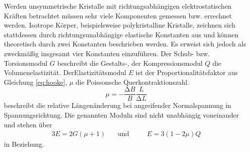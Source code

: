 Werden unsymmetrische Kristalle mit richtungsabhängigen elektrostatischen Kräften betrachtet müssen sehr viele Komponenten gemessen bzw. errechnet werden. 
Isotrope Körper, beispielsweise polykristalline Kristalle, zeichnen sich stattdessen durch richtungsunabhängige elastische Konstanten aus und können theoretisch durch zwei Konstanten beschrieben werden. 
Es erweist sich jedoch als zweckmäßig insgesamt vier Konstanten einzuführen.
Der Schub- bzw. Torsionsmodul $G$ beschreibt die Gestalts-, der Kompressionsmodul $Q$ die Volumenelastizität.
DerElastizitätsmodul $E$ ist der Proportionalitätsfaktor aus Gleichung \eqref{eq:hooke}, $\mu$ die Poissonsche Querkontraktionszahl. 
\begin{equation}
\mu=-\frac{\mathup{\Delta}{B}}{B}\frac{L}{\mathup{\Delta}{L}}
\label{eq:mu}
\end{equation}
beschreibt die relative Längenänderung bei angreifender Normalspannung in Spannungsrichtung.
Die genannten Moduln sind nicht unabhängig voneinander und stehen über
\begin{alignat}{3}
	 E=2G(\mu+1) &\quad\text{und} &&\quad E=3(1-2\mu)Q
\label{eq:modulbeziehungen}
\end{alignat}
in Beziehung.

